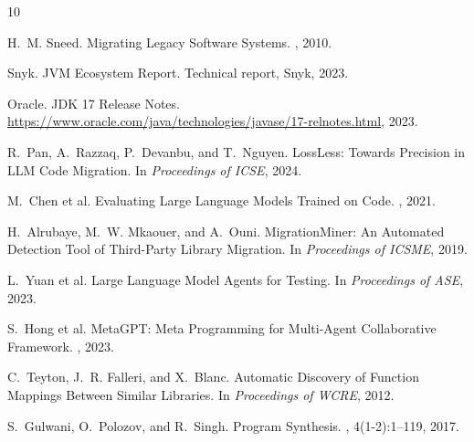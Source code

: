 \documentclass[sigconf,review,anonymous]{acmart}
\begin{document}

\begin{thebibliography}{10}

H.~M. Sneed.
\newblock Migrating Legacy Software Systems.
, 2010.

Snyk.
 JVM Ecosystem Report.
\newblock Technical report, Snyk, 2023.

Oracle.
\newblock JDK 17 Release Notes.
\newblock \url{https://www.oracle.com/java/technologies/javase/17-relnotes.html}, 2023.

R.~Pan, A.~Razzaq, P.~Devanbu, and T.~Nguyen.
\newblock LossLess: Towards Precision in LLM Code Migration.
\newblock In {\em Proceedings of ICSE}, 2024.

M.~Chen et al.
\newblock Evaluating Large Language Models Trained on Code.
, 2021.

H.~Alrubaye, M.~W. Mkaouer, and A.~Ouni.
\newblock MigrationMiner: An Automated Detection Tool of Third-Party Library Migration.
\newblock In {\em Proceedings of ICSME}, 2019.

L.~Yuan et al.
\newblock Large Language Model Agents for Testing.
\newblock In {\em Proceedings of ASE}, 2023.

S.~Hong et al.
\newblock MetaGPT: Meta Programming for Multi-Agent Collaborative Framework.
, 2023.

C.~Teyton, J.~R. Falleri, and X.~Blanc.
\newblock Automatic Discovery of Function Mappings Between Similar Libraries.
\newblock In {\em Proceedings of WCRE}, 2012.

S.~Gulwani, O.~Polozov, and R.~Singh.
\newblock Program Synthesis.
, 4(1-2):1--119, 2017.

\end{thebibliography}
\end{document}
